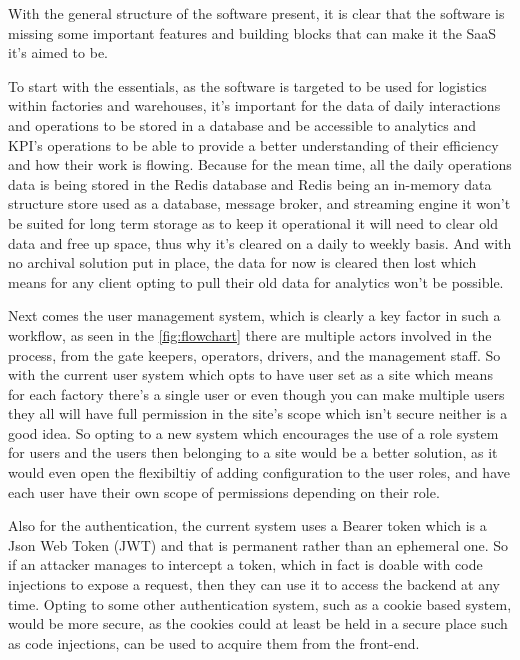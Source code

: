 With the general structure of the software present, it is clear that the
software is missing some important features and building blocks that can make it 
the SaaS it's aimed to be.

To start with the essentials, as the software is targeted to be used for logistics
within factories and warehouses, it's important for the data of daily interactions and
operations to be stored in a database and be accessible to analytics and KPI's operations
to be able to provide a better understanding of their efficiency and how their
work is flowing. Because for the mean time, all the daily operations data is being stored
in the Redis database and Redis being an in-memory data structure store used as a database,
message broker, and streaming engine \cite{redis_def} it won't be suited for long term storage
as to keep it operational it will need to clear old data and free up space, thus why it's cleared
on a daily to weekly basis. And with no archival solution put in place, the data for now is
cleared then lost which means for any client opting to pull their old data for analytics
won't be possible.

Next comes the user management system, which is clearly a key factor in such a workflow, 
as seen in the \ref{fig:flowchart} there are multiple actors involved in the process,
from the gate keepers, operators, drivers, and the management staff. So with the current
user system which opts to have user set as a site which means for each factory there's a
single user or even though you can make multiple users they all will have full permission
in the site's scope which isn't secure neither is a good idea. So opting to a new system
which encourages the use of a role system for users and the users then belonging to a site
would be a better solution, as it would even open the flexibiltiy of adding configuration
to the user roles, and have each user have their own scope of permissions depending on
their role.

Also for the authentication, the current system uses a Bearer token which is a Json Web
Token (JWT) and that is permanent rather than an ephemeral one. So if an attacker manages
to intercept a token, which in fact is doable with code injections to expose a request,
then they can use it to access the backend at any time.
Opting to some other authentication system, such as a cookie based system, would be more
secure, as the cookies could at least be held in a secure place such as code injections,
can be used to acquire them from the front-end.

